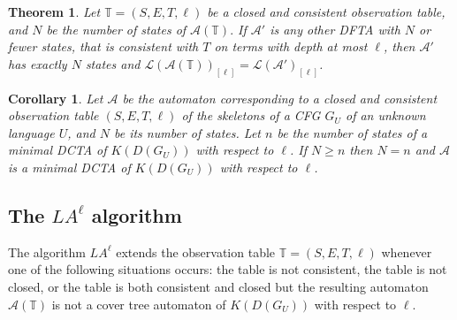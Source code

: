 \documentclass[preprint,12pt,english]{article}
\def\cA{\mathcal{A}}
\def\cL{\mathcal{L}}
\newtheorem{corollary}{Corollary}
\newtheorem{theorem}{Theorem}
\begin{document}
\begin{theorem}
\label{oops}
Let $\mathbb{T}=(S,E,T,\ell)$ be a closed and consistent observation table, and $N$ be the number of states of $\cA(\mathbb{T}).$ If $\cA'$ is any other DFTA with $N$ or fewer states, that is consistent with $T$ on terms with depth at most $\ell$, then $\cA'$ has exactly $N$ states and $\cL(\cA(\mathbb{T}))_{[\ell]}=\cL(\cA')_{[\ell]}$. 
\end{theorem}

\begin{corollary}
\label{cor2}
Let $\cA$ be the automaton corresponding to a closed and consistent observation table $(S,E,T,\ell)$ of the skeletons of a CFG $G_U$ of an unknown language $U$, and $N$ be its number of states. Let $n$ be the number of states of a minimal DCTA of $K(D(G_U))$ with respect to $\ell$. If $N\geq n$ then $N=n$ and $\cA$ is a minimal DCTA of $K(D(G_U))$ with respect to $\ell$.
\end{corollary}
\subsection*{The $LA^\ell$ algorithm}
The algorithm $LA^\ell$ extends the observation table $\mathbb{T}=(S,E,T,\ell)$ whenever one of the following situations occurs: the table is not consistent, the table is not closed, or the table is both consistent and closed but the resulting automaton $\cA(\mathbb{T})$  is not a cover tree automaton of $K(D(G_U))$ with respect to $\ell$.
\end{document}

